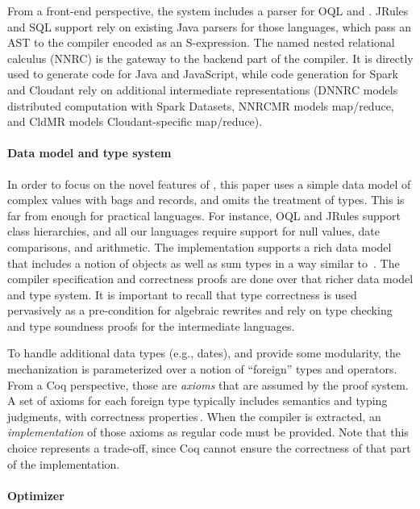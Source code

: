 From a front-end perspective, the system includes a parser for OQL and
\NRALambda. JRules and SQL support rely on existing Java parsers for
those languages, which pass an AST to the compiler encoded as an
S-expression. The named nested relational calculus (NNRC) is the
gateway to the backend part of the compiler. It is directly used to
generate code for Java and JavaScript, while code generation for Spark
and Cloudant rely on additional intermediate representations (DNNRC
models distributed computation with Spark Datasets, NNRCMR models
map/reduce, and CldMR models Cloudant-specific map/reduce).

\paragraph*{Data model and type system}

In order to focus on the novel features of \NRAEnv, this paper uses a
simple data model of complex values with bags and records, and omits
the treatment of types. This is far from enough for practical
languages. For instance, OQL and JRules support class hierarchies, and all
our languages require support for null values, date comparisons, and
arithmetic. The implementation supports a rich data model that
includes a notion of objects as well as sum types in a way similar
to~\cite{GiorgidzeGUW12,WF2016}. The compiler specification and
correctness proofs are done over that richer data model and type
system. It is important to recall that type correctness is used
pervasively as a pre-condition for algebraic rewrites and rely on type
checking and type soundness proofs for the intermediate languages.

To handle additional data types (e.g., dates), and provide some
modularity, the mechanization is parameterized over a notion of
``foreign'' types and operators. From a Coq perspective, those are
\emph{axioms} that are assumed by the proof system. A set of axioms
for each foreign type typically includes semantics and typing
judgments, with correctness
properties\,. When the compiler is
extracted, an \emph{implementation} of those axioms as regular code
must be provided. Note that this choice represents a trade-off, since
Coq cannot ensure the correctness of that part of the implementation.

\paragraph*{Optimizer}

